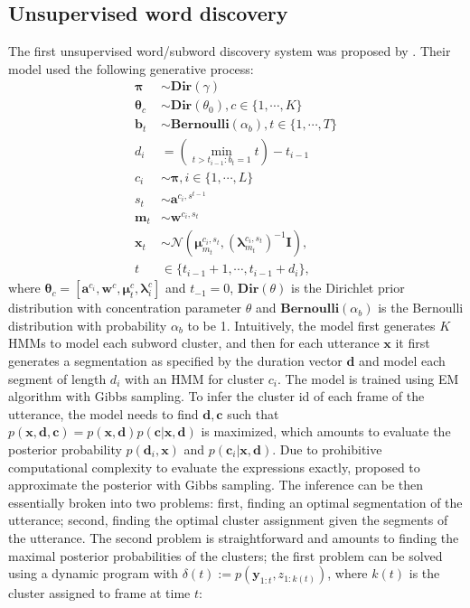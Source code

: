 \documentclass[journal]{IEEEtran}
\begin{document}
\subsection{Unsupervised word discovery}
The first unsupervised word/subword discovery system was proposed by \cite{Lee2012}. Their model used the following generative process:
\begin{align}\label{eq:generate_subword_hmm}
    \mathbf \pi &\sim \mathbf{Dir}(\gamma)\\
    \mathbf \theta_c &\sim \mathbf{Dir}(\theta_0), c \in \{1, \cdots, K\}\\
    \mathbf b_t &\sim \mathbf{Bernoulli}(\alpha_b), t \in \{1, \cdots, T\}\\
    d_i &= \left(\min_{t>t_{i-1}:b_t=1} t\right) - t_{i-1}\\
    c_i &\sim \mathbf \pi, i \in \{1, \cdots, L\}\\
    s_t &\sim \mathbf a^{c_i, s^{t-1}}\\
    \mathbf m_t &\sim \mathbf w^{c_i, s_t}\\
    \mathbf x_t &\sim \mathcal N(\mathbf \mu^{c_i, s_t}_{m_t}, (\mathbf \lambda^{c_i, s_t}_{m_t})^{-1}\mathbf I), \\
    t &\in \{t_{i-1}+1, \cdots, t_{i-1}+d_i\},
\end{align}
where $\mathbf \theta_c = [\mathbf a^{c_i}, \mathbf w^c, \mathbf \mu_t^{c}, \mathbf \lambda_i^c]$ and $t_{-1} = 0$, $\mathbf{Dir}(\theta)$ is the Dirichlet prior distribution with concentration parameter $\theta$ and $\mathbf{Bernoulli}(\alpha_b)$ is the Bernoulli distribution with probability $\alpha_b$ to be 1. Intuitively, the model first generates $K$ HMMs to model each subword cluster, and then for each utterance $\mathbf x$ it first generates a segmentation as specified by the duration vector $\mathbf d$ and model each segment of length $d_i$ with an HMM for cluster $c_i$. The model is trained using EM algorithm with Gibbs sampling. To infer the cluster id of each frame of the utterance, the model needs to find $\mathbf d, \mathbf c$ such that $p(\mathbf x, \mathbf d, \mathbf c)=p(\mathbf x, \mathbf d)p(\mathbf c|\mathbf x, \mathbf d)$  is maximized, which amounts to evaluate the posterior probability $p(\mathbf d_i, \mathbf x)$ and $p(\mathbf c_i|\mathbf x, \mathbf d)$. Due to prohibitive computational complexity to evaluate the expressions exactly, \cite{Lee2012} proposed to approximate the posterior with Gibbs sampling. The inference can be then essentially broken into two problems: first, finding an optimal segmentation of the utterance; second, finding the optimal cluster assignment given the segments of the utterance. The second problem is straightforward and amounts to finding the maximal posterior probabilities of the clusters; the first problem can be solved using a dynamic program with $\delta(t) := p(\mathbf y_{1:t}, z_{1:k(t)})$, where $k(t)$ is the cluster assigned to frame at time $t$:
\end{document}
